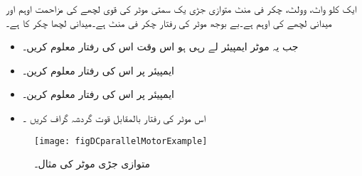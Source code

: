 ایک  کلو واٹ،  وولٹ،  چکر فی منٹ متوازی جڑی یک سمتی موٹر کی قوی لچھے کی مزاحمت  اوہم  اور میدانی لچھے کی   اوہم ہے۔بے بوجھ موٹر کی رفتار  چکر فی منٹ ہے۔میدانی لچھا  چکر کا ہے۔
\begin{itemize}
\item
جب یہ موٹر  ایمپیئر  لے رہی ہو اس وقت اس کی رفتار معلوم کریں۔
\item
{} ایمپیئر پر اس کی رفتار معلوم کرین۔
\item
{} ایمپیئر پر اس کی رفتار معلوم کرین۔
\item
اس موٹر کی رفتار بالمقابل قوت گردشہ گراف کریں  ۔
\end{itemize}

\begin{figure}
\centering
\texttt{[image: figDCparallelMotorExample]}
\caption{متوازی جڑی موٹر کی مثال۔}
\label{شکل_یکسمتی_متوازی_موٹر_کی_مثال}
\end{figure}

